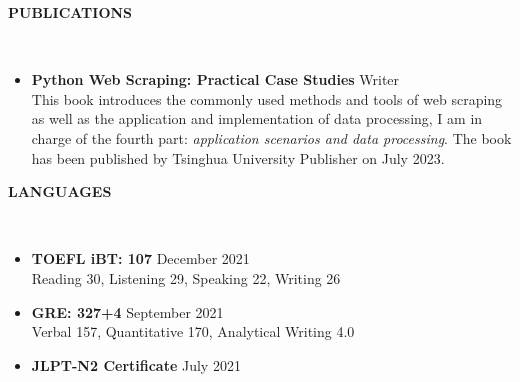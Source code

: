 \documentclass[10pt,article]{article}
\newcommand{\resheading}[1]{%
  {\small\colorbox{mygrey}{%
    \begin{minipage}{0.97\textwidth}\centering\textbf{#1 \vphantom{p\^{E}}}\end{minipage}%
  }}%
}
\begin{document}
\resheading{\textbf{PUBLICATIONS}}\\
\begin{itemize}
  \item \textbf{Python Web Scraping: Practical Case Studies} \hfill Writer \\
  This book introduces the commonly used methods and tools of web scraping as well as the application and implementation of data processing, I am in charge of the fourth part: \textit{application scenarios and data processing}. The book has been published by Tsinghua University Publisher on July 2023.

\end{itemize}

\resheading{\textbf{LANGUAGES}}\\
\begin{itemize}
  \item \textbf{TOEFL iBT: 107} \hfill December 2021\\
  Reading 30, Listening 29, Speaking 22, Writing 26 
  \item \textbf{GRE: 327+4 } \hfill September 2021 \\
  Verbal 157, Quantitative 170, Analytical Writing 4.0
  \item \textbf{JLPT-N2 Certificate} \hfill July 2021 \\
\end{itemize}
\end{document}
